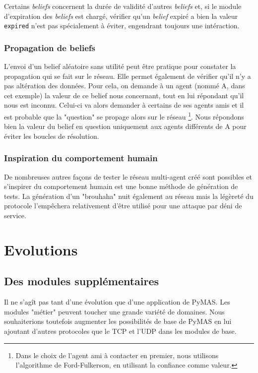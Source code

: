 \documentclass[11pt]{book}
\begin{document}
Certains \textit{beliefs} concernent la durée de validité d'autres 
\textit{beliefs} et, si le module d'expiration des \textit{beliefs} est 
chargé, vérifier qu'un \textit{belief} expiré a bien la valeur 
\verb?expired? n'est pas spécialement à éviter, engendrant toujours une 
intéraction.

\subsection{Propagation de beliefs}
L'envoi d’un belief aléatoire sans utilité peut être pratique pour 
constater la propagation qui se fait sur le réseau. Elle permet également 
de vérifier qu’il n’y a pas altération des données. Pour cela, on demande 
à un agent (nommé A, dans cet exemple) la valeur de ce belief nous 
concernant, tout en lui répondant qu'il nous est inconnu. Celui-ci va 
alors demander à certains de ses agents amis et il est probable que la 
"question" se propage alors sur le réseau \footnote {Dans le choix de l'agent 
ami à contacter en premier, nous utilisons l'algorithme de Ford-Fulkerson, en 
utilisant la confiance comme valeur.}. Nous répondons bien la valeur du 
belief en question uniquement aux agents différents de A pour éviter les 
boucles de résolution.

\subsection{Inspiration du comportement humain}
De nombreuses autres façons de tester le réseau multi-agent créé sont 
possibles et s'inspirer du comportement humain est une bonne méthode de 
génération de tests. La génération d'un "brouhaha" nuit également au
réseau mais la légèreté du protocole l'empêchera relativement d’être 
utilisé pour une attaque par déni de service.

\chapter{Evolutions}
\section{Des modules supplémentaires}
Il ne s'agît pas tant d'une évolution que d'une application de PyMAS. Les 
modules "métier" peuvent toucher une grande variété de domaines. 
Nous souhaiterions toutefois augmenter les possibilités de base de PyMAS en 
lui ajoutant d'autres protocoles que le TCP et l'UDP dans les modules de base.
\end{document}
